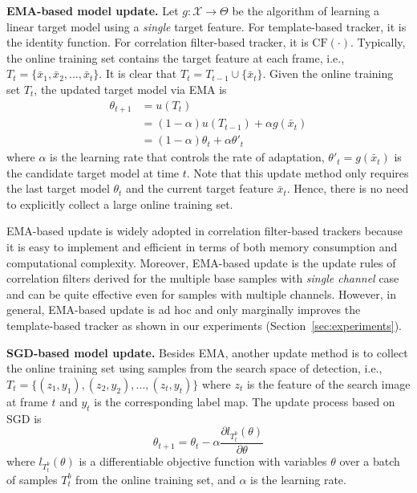 \documentclass[journal]{IEEEtran}
\begin{document}
\textbf{EMA-based model update.} Let $g: \mathcal{X} \to \Theta$ be the algorithm of learning a linear target model using a \emph{single} target feature. For template-based tracker, it is the identity function. For correlation filter-based tracker, it is $\mathrm{CF}(\cdot)$. Typically, the online training set contains the target feature at each frame, i.e., $T_t = \{\bar{x}_1, \bar{x}_2, ..., \bar{x}_t\}$. It is clear that $T_t = T_{t-1} \cup \{\bar{x}_t\}$. Given the online training set $T_t$, the updated target model via EMA is 
\begin{subequations}\label{eq:exponential-moving-average}
	\begin{align}
    \theta_{t+1} &= u(T_t)  \\
                 &= (1 - \alpha) u(T_{t-1}) + \alpha g(\bar{x}_t) \\
                 &= (1 - \alpha)\theta_t + \alpha \theta'_t
	\end{align}
\end{subequations}
where $\alpha$ is the learning rate that controls the rate of adaptation, $\theta'_t = g(\bar{x}_t)$ is the candidate target model at time $t$. Note that this update method only requires the last target model $\theta_t$ and the current target feature $\bar{x}_t$. Hence, there is no need to explicitly collect a large online training set.

EMA-based update is widely adopted in correlation filter-based trackers because it is easy to implement and efficient in terms of both memory consumption and computational complexity. Moreover, EMA-based update is the update rules of correlation filters derived for the multiple base samples with \emph{single channel} case \cite{bolme2010visual} and can be quite effective even for samples with multiple channels. However, in general, EMA-based update is ad hoc and only marginally improves the template-based tracker as shown in our experiments (Section~\ref{sec:experiments}).

\textbf{SGD-based model update.} Besides EMA, another update method is to collect the online training set using samples from the search space of detection, i.e., $T_t = \{(z_1, y_1), (z_2, y_2), ..., (z_t, y_t)\}$ where $z_t$ is the feature of the search image at frame $t$ and $y_t$ is the corresponding label map. The update process based on SGD is
\begin{equation}
  \theta_{t+1} = \theta_{t} - \alpha \frac{\partial l_{T_t^b}(\theta)}{\partial \theta}
\end{equation}
where $l_{T_t^b}(\theta)$ is a differentiable objective function with variables $\theta$ over a batch of samples $T_t^b$ from the online training set, and $\alpha$ is the learning rate. 
\end{document}
